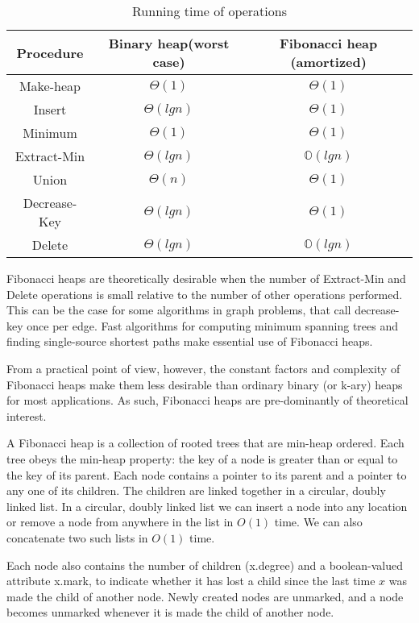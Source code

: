 \begin{table}[h!]
\caption{Running time of operations}
\begin{tabular}{ccc}
	Procedure & Binary heap(worst case) & Fibonacci heap (amortized) \\ \hline
	Make-heap & $\Theta(1)$ & $\Theta(1)$ \\
	Insert    & $\Theta(lg n)$ & $\Theta(1)$ \\
	Minimum   & $\Theta(1)$ & $\Theta(1)$ \\
	Extract-Min & $\Theta(lg n)$ & $\mathbb{O}(lg n)$ \\
	Union	& $\Theta(n)$ & $\Theta(1)$ \\
	Decrease-Key & $\Theta(lg n)$ & $\Theta(1)$ \\
	Delete & $\Theta(lg n)$ & $\mathbb{O}(lg n)$
\end{tabular}
\end{table}

Fibonacci heaps are theoretically desirable when the number
of Extract-Min and Delete operations is small relative to the
number of other operations performed. This can be the case for
some algorithms in graph problems, that call decrease-key once
per edge. Fast algorithms for computing minimum spanning trees and
finding single-source shortest paths make essential use of
Fibonacci heaps.

From a practical point of view, however, the constant factors
and complexity of Fibonacci heaps make them less desirable than
ordinary binary (or k-ary) heaps for most applications.
As such, Fibonacci heaps are pre-dominantly of theoretical
interest.

A Fibonacci heap is a collection of rooted trees that are
min-heap ordered. Each tree obeys the min-heap property: the
key of a node is greater than or equal to the key of its
parent. Each node contains a pointer to its parent and a pointer
to any one of its children. The children are linked together in
a circular, doubly linked list. In a circular, doubly linked list
we can insert a node into any location or remove a node from
anywhere in the list in $O(1)$ time. We can also concatenate two
such lists in $O(1)$ time. 

Each node also contains the number of children (x.degree) and
a boolean-valued attribute x.mark, to indicate whether it has
lost a child since the last time $x$ was made the child of another
node. Newly created nodes are unmarked, and a node becomes unmarked
whenever it is made the child of another node.

